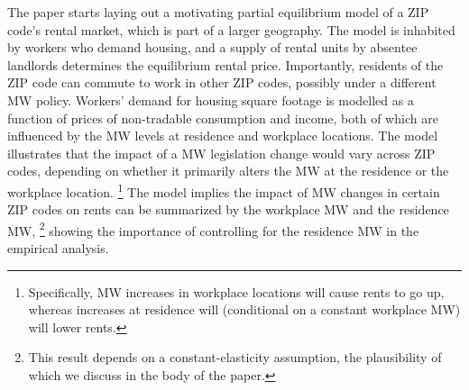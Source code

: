 
The paper starts laying out a motivating partial equilibrium model of a ZIP 
code's rental market, which is part of a larger geography.
The model is inhabited by workers who demand housing, and a supply of rental 
units by absentee landlords determines the equilibrium rental price.
Importantly, residents of the ZIP code can commute to work in other ZIP 
codes, possibly under a different MW policy.
Workers' demand for housing square footage is modelled as a function of prices
of non-tradable consumption and income, both of which are influenced by the MW 
levels at residence and workplace locations.
The model illustrates that the impact of a MW legislation change would vary 
across ZIP codes, depending on whether it primarily alters the MW at the
residence or the workplace location.%
\footnote{Specifically, MW increases in workplace locations will cause rents to 
    go up, whereas increases at residence will (conditional on a constant 
    workplace MW) will lower rents.}
The model implies the impact of MW changes in certain ZIP codes on rents can 
be summarized by the workplace MW and the residence MW,%
\footnote{This result depends on a constant-elasticity assumption, the plausibility
    of which we discuss in the body of the paper.}
showing the importance of controlling for the residence MW in the empirical 
analysis.


